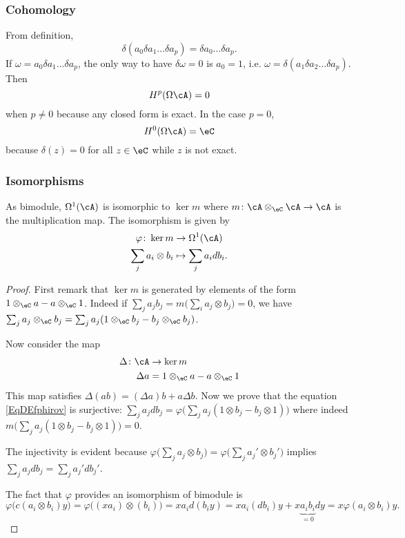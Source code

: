 \subsubsection{Cohomology}

From definition,
\[
	\delta(a_0\delta a_1\ldots\delta a_p)=\delta a_0\ldots\delta a_p.
\]
If $\omega=a_0\delta a_1\ldots\delta a_p$, the only way to have $\delta\omega=0$ is $a_0=1$, i.e. $\omega=\delta(a_1\delta a_2\ldots\delta a_p)$. Then
\[
	H^p(\Omega\cA)=0
\]
when $p\neq 0$ because any closed form is exact. In the case $p=0$,
\[
	H^0(\Omega\cA)=\eC
\]
because $\delta(z)=0$ for all $z\in\eC$ while $z$ is not exact.

\subsubsection{Isomorphisms}

\begin{lemma}
	As bimodule, $\Omega^1(\cA)$ is isomorphic to $\ker m$ where $m\colon \cA\otimes_{\eC}\cA\to \cA$ is the multiplication map. The isomorphism is given by
	\begin{equation}   \label{EqDEfphirov}
		\begin{aligned}
			\varphi\colon \ker m   & \to \Omega^1(\cA)        \\
			\sum_{j}a_i\otimes b_i & \mapsto \sum_{j}a_idb_i.
		\end{aligned}
	\end{equation}

\end{lemma}

\begin{proof}
	First remark that $\ker m$ is generated by elements of the form $1\otimes_{\eC}a-a\otimes_{\eC}1$. Indeed if $\sum_{j}a_jb_j=m\big( \sum_{i}a_j\otimes b_j \big)=0$, we have $\sum_{j}a_j\otimes_{\eC}b_j=\sum_{j}a_j(1\otimes_{\eC} b_j-b_j\otimes_{\eC}b_j)$.

	Now consider the map
	\begin{equation}
		\begin{aligned}
			\Delta\colon \cA & \to \ker m                        \\
			\Delta a         & = 1\otimes_{\eC}a-a\otimes_{\eC}1
		\end{aligned}
	\end{equation}
	This map satisfies $\Delta(ab)=(\Delta a)b+a\Delta b$. Now we prove that the equation \eqref{EqDEfphirov} is surjective: $\sum_{j}a_jdb_j=\varphi\big( \sum_{j}a_j(1\otimes b_j-b_j\otimes 1) \big)$ where indeed $m\big( \sum_{j}a_j(1\otimes b_j-b_j\otimes 1) \big)=0$.

	The injectivity is evident because $\varphi\big( \sum_{j}a_j\otimes b_j \big)=\varphi\big( \sum_{j}a_j'\otimes b_j' \big)$ implies $\sum_{j}a_jdb_j=\sum_{j}a_j'db_j'$.

	The fact that $\varphi$ provides an isomorphism of bimodule is
	\[
		\varphi\big( c(a_i\otimes b_i)y \big)=\varphi\big( (xa_i)\otimes(b_i) \big)
		=xa_id(b_iy)
		=xa_i(db_i)y+x\underbrace{a_ib_i}_{=0}dy
		=x\varphi(a_i\otimes b_i)y.
	\]
\end{proof}

